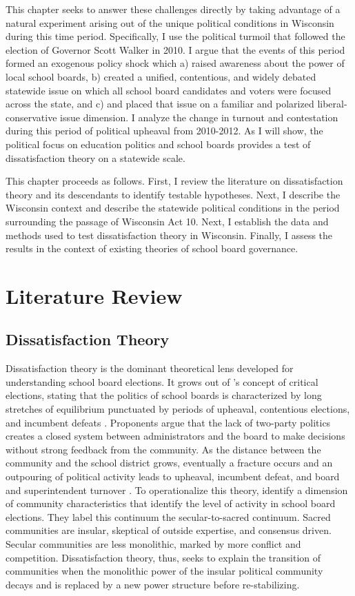 This chapter seeks to answer these challenges directly by taking advantage of a natural 
experiment arising out of the unique political conditions in Wisconsin during this 
time period. Specifically, I use the political turmoil that followed the election 
of Governor Scott Walker in 2010. I argue that the events of this 
period formed an exogenous policy shock which a) raised awareness about the power 
of local school boards, b) created a unified, contentious, and 
widely debated statewide issue on which all school board candidates and voters 
were focused across the state, and c) and placed that issue on a familiar and polarized 
liberal-conservative issue dimension. I analyze the change in turnout and contestation 
during this period of political upheaval from 2010-2012. As I will show, the 
political focus on education politics and school boards provides a test 
of dissatisfaction theory on a statewide scale. 

This chapter proceeds as follows. First, I review the literature on dissatisfaction 
theory and its descendants to identify testable hypotheses. Next, I describe the 
Wisconsin context and describe the statewide political conditions in the period 
surrounding the passage of Wisconsin Act 10. Next, I establish the data and methods 
used to test dissatisfaction theory in Wisconsin. Finally, I assess the results 
in the context of existing theories of school board governance. 

\section{Literature Review}

\subsection{Dissatisfaction Theory}

Dissatisfaction theory is the dominant theoretical lens developed 
for understanding school board elections. It grows out of \citet{RefWorks:348}'s
concept of critical elections, stating that the politics of school boards is 
characterized by long stretches of equilibrium punctuated by periods of upheaval,
contentious elections, and incumbent defeats \citep{RefWorks:297}. Proponents 
argue that the lack of two-party politics creates a closed system between 
administrators and the board to make decisions without strong feedback from the
community. As the distance between the community and the school 
district grows, eventually a fracture occurs and an outpouring of political activity 
leads to upheaval, incumbent defeat, and board and superintendent turnover 
\citep{RefWorks:271}. To operationalize this theory, \citet{RefWorks:297} identify 
a dimension of community characteristics that identify the level of activity in 
school board elections. They label this continuum the secular-to-sacred continuum. 
Sacred communities are insular, skeptical of outside expertise, and consensus 
driven. Secular communities are less monolithic, marked by more conflict and 
competition. Dissatisfaction theory, thus, seeks to explain the transition of 
communities when the monolithic power of the insular political community decays 
and is replaced by a new power structure before re-stabilizing. 


